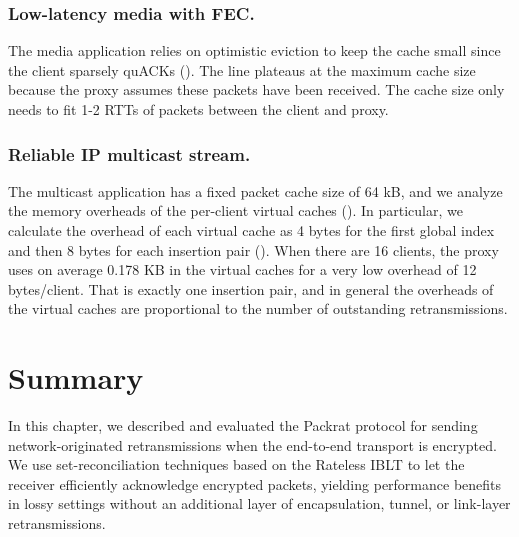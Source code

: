 \subsubsection{Low-latency media with FEC.}

The media application relies on optimistic eviction to keep the cache small
since the client sparsely quACKs (). The
line plateaus at the maximum cache size because the proxy
assumes these packets have been received. The cache size only needs to fit 1-2
RTTs of packets between the client and proxy.

\subsubsection{Reliable IP multicast stream.}

The multicast application has a fixed packet cache size of 64 kB, and we analyze
the memory overheads of the per-client virtual caches ().
In particular, we calculate the overhead of each virtual cache as 4 bytes for
the first global index and then 8 bytes for each insertion pair
(). When there are 16 clients, the proxy
uses on average 0.178 KB in the virtual caches for a very low overhead of 12
bytes/client. That is exactly one insertion pair, and in general the overheads
of the virtual caches are proportional to the number of outstanding
retransmissions.

\section{Summary}
\label{sec:packrat:summary}

In this chapter, we described and evaluated the Packrat protocol for sending
network-originated retransmissions when the end-to-end transport is encrypted.
We use set-reconciliation techniques based on the Rateless IBLT to let the
receiver efficiently acknowledge encrypted packets, yielding performance
benefits in lossy settings without an additional layer of encapsulation,
tunnel, or link-layer retransmissions.

